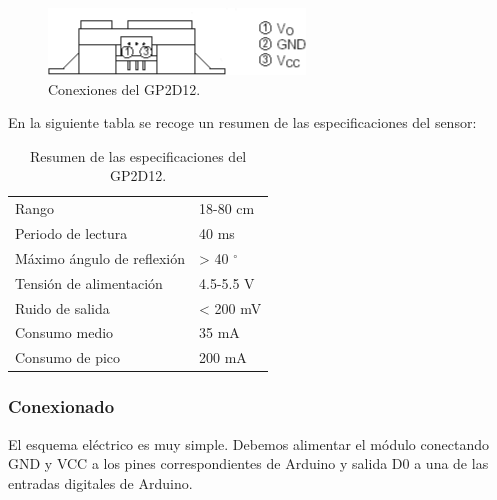  \begin{figure}[H]
  \begin{center}
    \includegraphics[scale=1.8]{imagenes/pines_sharp.png}
  \end{center}
  \caption{Conexiones del GP2D12.}
  \label{figura:pines_sharp}
\end{figure}

En la siguiente tabla se recoge un resumen de las especificaciones del sensor:\\

\begin{table}[H]
  \begin{center}
    \begin{tabular}{|p{8cm}|p{2cm}|}
      \hline
      {Rango} & {18-80 cm}\\
      {Periodo de lectura} & {40 ms}\\
      {Máximo ángulo de reflexión} & {> 40 $^{\circ}$}\\
      {Tensión de alimentación} & {4.5-5.5 V}\\
      {Ruido de salida} & { < 200 mV }\\
      {Consumo medio} & { 35 mA }\\
      {Consumo de pico} & { 200 mA }\\
      \hline
      \end{tabular}
  \end{center}
  \caption{Resumen de las especificaciones del GP2D12.}
\end{table}

\subsubsection{Conexionado}

El esquema eléctrico es muy simple. Debemos alimentar el módulo conectando GND y
VCC a los pines correspondientes de Arduino y salida D0 a una de las entradas digitales
de Arduino.\\

